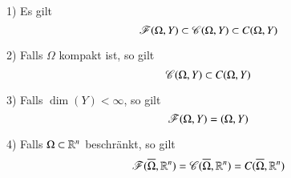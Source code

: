 \begin{remark}
    \begin{description}
        \item{1)}
        Es gilt
        \[
            \mathscr F(\Omega,Y)\subset \mathscr C(\Omega,Y)\subset C(\Omega,Y)
        \]
        \item{2)}
        Falls $\Omega$ kompakt ist, so gilt
        \[
            \mathscr C(\Omega,Y)\subset C(\Omega,Y)
        \]
        \item{3)}
        Falls $\dim(Y)<\infty$, so gilt
        \[
            \mathscr F(\Omega,Y)=\mathscr (\Omega,Y)
        \]
        \item{4)}
        Falls $\Omega\subset\mathbb{R}^n$ beschränkt, so gilt
        \[
            \mathscr F (\overline \Omega,\mathbb{R}^n)=\mathscr C(\overline \Omega,\mathbb{R}^n)=C(\overline\Omega,\mathbb{R}^n)
        \]
    \end{description}
\end{remark}


